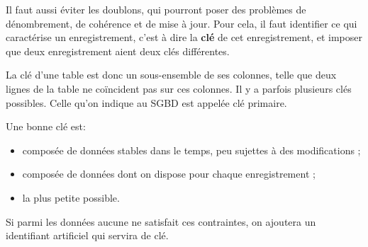 \documentclass[a4paper]{scrartcl}
\begin{document}
		\rem Il faut aussi éviter les doublons, qui pourront poser des problèmes de dénombrement, de cohérence et de mise à jour.
		Pour cela, il faut identifier ce qui caractérise un enregistrement, c'est à dire la \textbf{clé} de cet enregistrement,
		et imposer que deux enregistrement aient deux clés différentes.

		La clé d'une table est donc un sous-ensemble de ses colonnes, telle que deux lignes de la table ne coïncident pas sur ces colonnes.
		Il y a parfois plusieurs clés possibles. Celle qu'on indique au SGBD est appelée clé primaire.

		Une bonne clé est:
		\begin{itemize}
			\item composée de données stables dans le temps, peu sujettes à des modifications ;
			\item composée de données dont on dispose pour chaque enregistrement ;
			\item la plus petite possible.
		\end{itemize}
		
		Si parmi les données aucune ne satisfait ces contraintes, on ajoutera un identifiant artificiel qui servira de clé.
	
\end{document}
